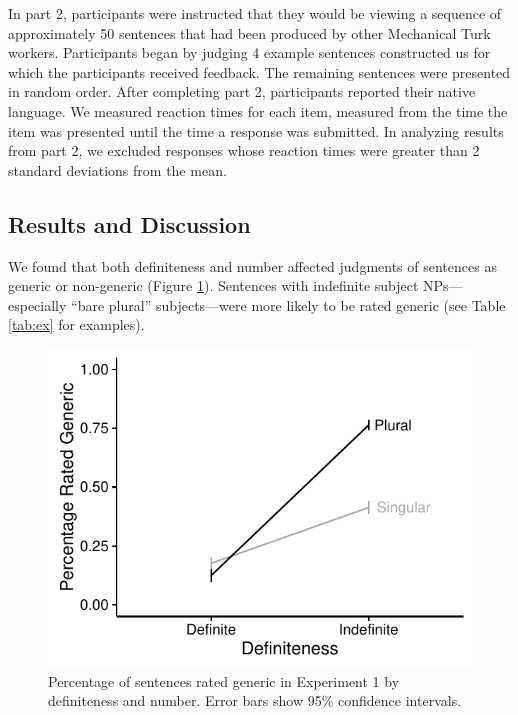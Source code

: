 \documentclass[10pt,letterpaper]{article}
\begin{document}
In part 2, participants were instructed that they would be viewing a sequence of approximately 50 sentences that had been produced by other Mechanical Turk workers. Participants began by judging 4 example sentences constructed us for which the participants received feedback. The remaining sentences were presented in random order. After completing part 2, participants reported their native language. We measured reaction times for each item, measured from the time the item was presented until the time a response was submitted.  In analyzing results from part 2, we excluded responses whose reaction times were greater than 2 standard deviations from the mean.

\subsection{Results and Discussion}

We found that both definiteness and number affected judgments of sentences as generic or non-generic (Figure \ref{fig:e2}). Sentences with indefinite subject NPs---especially ``bare plural'' subjects---were more likely to be rated generic (see Table \ref{tab:ex} for examples).

\begin{figure}[t]
\centering
\includegraphics[width=.8\linewidth]{figures/e2-2016.pdf}
\caption{\label{fig:e2} Percentage of sentences rated generic in Experiment 1 by definiteness and number. Error bars show 95\% confidence intervals.}
\end{figure}
\end{document}
